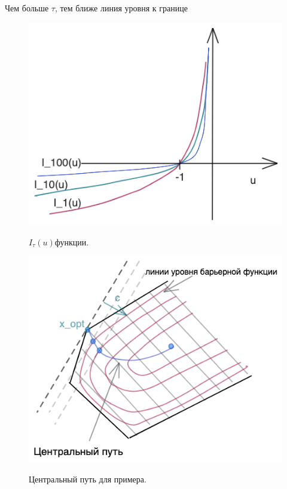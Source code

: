 Чем больше $\tau$, тем ближе линия уровня к границе


\begin{figure}[H]
        \centering
        \includegraphics[scale=0.45]{images/ind_pic.png}
        \label{}
        \caption{$I_{\tau}(u)$функции.}
        \endminipage\hfill
        \centering
        \includegraphics[scale=0.45]{images/path_pic.png}
        \label{}
        \caption{Центральный путь для примера.}
        \endminipage\hfill
\end{figure}



